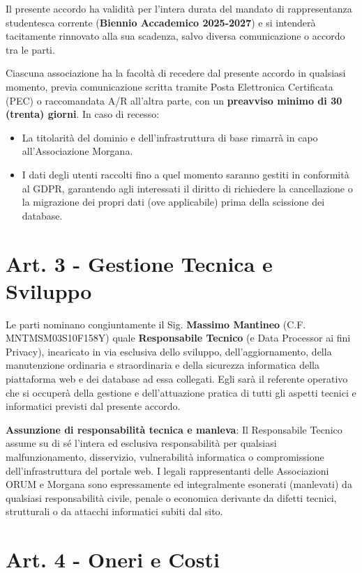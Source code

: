 \documentclass[a4paper,11pt]{article}
\begin{document}
Il presente accordo ha validità per l'intera durata del mandato di rappresentanza studentesca corrente (\textbf{Biennio Accademico 2025-2027}) e si intenderà tacitamente rinnovato alla sua scadenza, salvo diversa comunicazione o accordo tra le parti.

Ciascuna associazione ha la facoltà di recedere dal presente accordo in qualsiasi momento, previa comunicazione scritta tramite Posta Elettronica Certificata (PEC) o raccomandata A/R all'altra parte, con un \textbf{preavviso minimo di 30 (trenta) giorni}. In caso di recesso:
\begin{itemize}[leftmargin=*]
    \item La titolarità del dominio e dell'infrastruttura di base rimarrà in capo all'Associazione Morgana.
    \item I dati degli utenti raccolti fino a quel momento saranno gestiti in conformità al GDPR, garantendo agli interessati il diritto di richiedere la cancellazione o la migrazione dei propri dati (ove applicabile) prima della scissione dei database.
\end{itemize}

\section*{Art. 3 - Gestione Tecnica e Sviluppo}

Le parti nominano congiuntamente il Sig. \textbf{Massimo Mantineo} (C.F. MNTMSM03S10F158Y) quale \textbf{Responsabile Tecnico} (e Data Processor ai fini Privacy), incaricato in via esclusiva dello sviluppo, dell'aggiornamento, della manutenzione ordinaria e straordinaria e della sicurezza informatica della piattaforma web e dei database ad essa collegati. Egli sarà il referente operativo che si occuperà della gestione e dell'attuazione pratica di tutti gli aspetti tecnici e informatici previsti dal presente accordo.

\textbf{Assunzione di responsabilità tecnica e manleva}: Il Responsabile Tecnico assume su di sé l'intera ed esclusiva responsabilità per qualsiasi malfunzionamento, disservizio, vulnerabilità informatica o compromissione dell'infrastruttura del portale web. I legali rappresentanti delle Associazioni ORUM e Morgana sono espressamente ed integralmente esonerati (manlevati) da qualsiasi responsabilità civile, penale o economica derivante da difetti tecnici, strutturali o da attacchi informatici subiti dal sito.

\section*{Art. 4 - Oneri e Costi}
\end{document}
